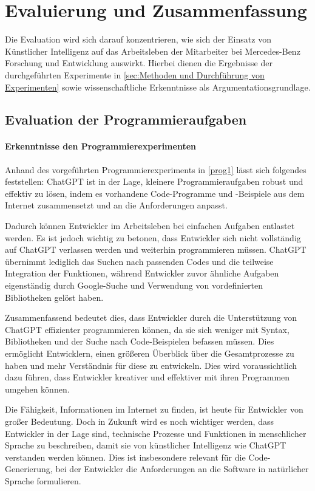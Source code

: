 \chapter{Evaluierung und Zusammenfassung}
\label{sec:evaluierung}
Die Evaluation wird sich darauf konzentrieren, wie sich der Einsatz von Künstlicher Intelligenz auf das Arbeitsleben der Mitarbeiter bei Mercedes-Benz Forschung und Entwicklung auswirkt. Hierbei dienen die Ergebnisse der durchgeführten Experimente in \autoref{sec:Methoden und Durchführung von Experimenten} sowie wissenschaftliche Erkenntnisse als Argumentationsgrundlage.

\section{Evaluation der Programmieraufgaben}

\subsubsection{Erkenntnisse den Programmierexperimenten}
Anhand des vorgeführten Programmierexperiments in \autoref{prog1} lässt sich folgendes feststellen: ChatGPT ist in der Lage, kleinere Programmieraufgaben robust und effektiv zu lösen, indem es vorhandene Code-Programme und -Beispiele aus dem Internet zusammensetzt und an die Anforderungen anpasst.

Dadurch können Entwickler im Arbeitsleben bei einfachen Aufgaben entlastet werden. Es ist jedoch wichtig zu betonen, dass Entwickler sich nicht vollständig auf ChatGPT verlassen werden und weiterhin programmieren müssen. ChatGPT übernimmt lediglich das Suchen nach passenden Codes und die teilweise Integration der Funktionen, während Entwickler zuvor ähnliche Aufgaben eigenständig durch Google-Suche und Verwendung von vordefinierten Bibliotheken gelöst haben.

Zusammenfassend bedeutet dies, dass Entwickler durch die Unterstützung von ChatGPT effizienter programmieren können, da sie sich weniger mit Syntax, Bibliotheken und der Suche nach Code-Beispielen befassen müssen. Dies ermöglicht Entwicklern, einen größeren Überblick über die Gesamtprozesse zu haben und mehr Verständnis für diese zu entwickeln. Dies wird voraussichtlich dazu führen, dass Entwickler kreativer und effektiver mit ihren Programmen umgehen können.

Die Fähigkeit, Informationen im Internet zu finden, ist heute für Entwickler von großer Bedeutung. Doch in Zukunft wird es noch wichtiger werden, dass Entwickler in der Lage sind, technische Prozesse und Funktionen in menschlicher Sprache zu beschreiben, damit sie von künstlicher Intelligenz wie ChatGPT verstanden werden können. Dies ist insbesondere relevant für die Code-Generierung, bei der Entwickler die Anforderungen an die Software in natürlicher Sprache formulieren.



